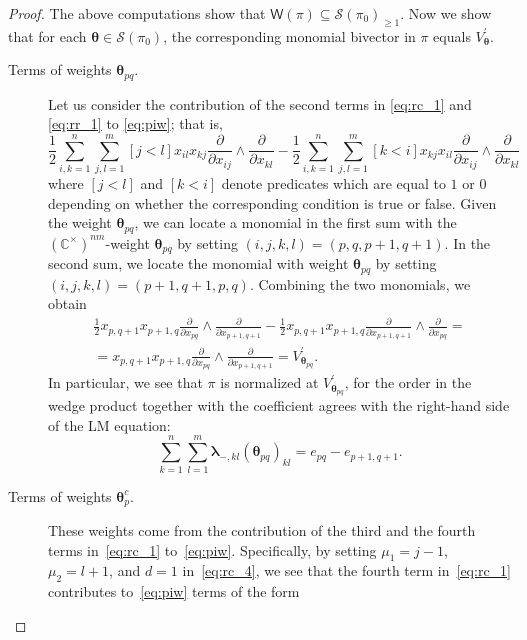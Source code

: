 \documentclass[11pt]{article}
\newcommand{\blambda}{\boldsymbol{\lambda}}
\newcommand{\btheta}{{\boldsymbol{\theta}}}
\theoremstyle{definition}\newtheorem{definition}[theorem]{Definition}
\theoremstyle{definition}\newtheorem{remark}[theorem]{Remark}
\theoremstyle{remark}
\numberwithin{equation}{section}
\begin{document}
\begin{proof}
    The above computations show that $\mathsf{W}(\pi)\subseteq \mathcal{S}(\pi_0)_{\geq 1}$. Now we show that for each $\btheta \in \mathcal{S}(\pi_0)$, the corresponding monomial bivector in $\pi$ equals $V_{\btheta}^\prime$.
    \begin{description}
        \item[Terms of weights $\btheta_{pq}$.] Let us consider the contribution of the second terms in \eqref{eq:rc_1} and \eqref{eq:rr_1} to \eqref{eq:piw}; that is,
        \begin{equation*}
            \frac{1}{2}\sum_{i,k=1}^n\sum_{j,l=1}^m [j < l] x_{il}x_{kj} \frac{\partial}{\partial x_{ij}}\wedge \frac{\partial}{\partial x_{kl}} - \frac{1}{2}\sum_{i,k=1}^n\sum_{j,l=1}^m [k<i]x_{kj}x_{il}\frac{\partial}{\partial x_{ij}}\wedge \frac{\partial}{\partial x_{kl}}
        \end{equation*}
        where $[j<l]$ and $[k<i]$ denote predicates which are equal to $1$ or $0$ depending on whether the corresponding condition is true or false. Given the weight $\btheta_{pq}$, we can locate a monomial in the first sum with the $(\mathbb{C}^{\times})^{nm}$-weight $\btheta_{pq}$ by setting $(i,j,k,l) = (p,q,p+1,q+1)$. In the second sum, we locate the monomial with weight $\btheta_{pq}$ by setting $(i,j,k,l) = (p+1,q+1,p,q)$. Combining the two monomials, we obtain 
        \begin{equation*}\begin{split}
            \frac{1}{2}x_{p,q+1}x_{p+1,q}\frac{\partial}{\partial x_{pq}} \wedge \frac{\partial}{\partial x_{p+1,q+1}} - \frac{1}{2}x_{p,q+1}x_{p+1,q}\frac{\partial}{\partial x_{p+1,q+1}}\wedge \frac{\partial}{\partial x_{pq}} = \\= x_{p,q+1} x_{p+1,q}\frac{\partial}{\partial x_{pq}}\wedge \frac{\partial}{\partial x_{p+1,q+1}} = V_{\btheta_{pq}}^\prime.
            \end{split}
        \end{equation*}
        In particular, we see that $\pi$ is normalized at $V_{\btheta_{pq}}^\prime$, for the order in the wedge product together with the coefficient agrees with the right-hand side of the LM equation:
        \begin{equation*}
            \sum_{k=1}^n\sum_{l=1}^m\blambda_{-,kl} (\btheta_{pq})_{kl} = e_{pq}-e_{p+1,q+1}.
        \end{equation*}
        \item[Terms of weights $\btheta_p^c$.] These weights come from the contribution of the third and the fourth terms in~\eqref{eq:rc_1} to~\eqref{eq:piw}. Specifically, by setting $\mu_1 = j-1$, $\mu_2 = l + 1$, and $d=1$ in~\eqref{eq:rc_4}, we see that the fourth term in~\eqref{eq:rc_1} contributes to~\eqref{eq:piw} terms of the form

\end{description}
\end{proof}
\end{document}
